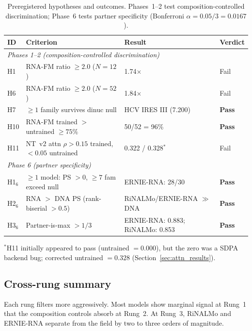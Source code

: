 \documentclass[11pt]{article}
\begin{document}
\begin{table}[ht]
\centering
\caption{Preregistered hypotheses and outcomes.
  Phases~1--2 test composition-controlled discrimination;
  Phase~6 tests partner specificity
  (Bonferroni $\alpha = 0.05/3 = 0.0167$).}
\label{tab:hypotheses}
\begin{tabular}{llll}
\toprule
ID & Criterion & Result & Verdict \\
\midrule
\multicolumn{4}{l}{\textit{Phases 1--2 (composition-controlled discrimination)}} \\
H1   & RNA-FM ratio $\geq 2.0$ ($N = 12$)                     & 1.74$\times$ & Fail \\
H6   & RNA-FM ratio $\geq 2.0$ ($N = 52$)                     & 1.84$\times$ & Fail \\
H7   & $\geq 1$ family survives dinuc null                     & HCV IRES III (7.200) & \textbf{Pass} \\
H10  & RNA-FM trained $>$ untrained $\geq 75\%$               & 50/52 = 96\% & \textbf{Pass} \\
H11  & NT~v2 attn $\rho > 0.15$ trained, $< 0.05$ untrained   & 0.322 / 0.328$^*$ & Fail \\
\midrule
\multicolumn{4}{l}{\textit{Phase 6 (partner specificity)}} \\
H1$_6$ & $\geq 1$ model: PS $> 0$, $\geq 7$ fam exceed null  & ERNIE-RNA: 28/30 & \textbf{Pass} \\
H2$_6$ & RNA $>$ DNA PS (rank-biserial $> 0.5$)               & RiNALMo/ERNIE-RNA $\gg$ DNA & \textbf{Pass} \\
H3$_6$ & Partner-is-max $> 1/3$                                & ERNIE-RNA: 0.883; RiNALMo: 0.853 & \textbf{Pass} \\
\bottomrule
\end{tabular}
\medskip

\small $^*$H11 initially appeared to pass (untrained $= 0.000$), but
the zero was a SDPA backend bug; corrected untrained $= 0.328$
(Section~\ref{sec:attn_results}).
\end{table}


\subsection{Cross-rung summary}
\label{sec:crossrung}

Each rung filters more aggressively.  Most models show marginal
signal at Rung~1 that the composition controls absorb at Rung~2.  At
Rung~3, RiNALMo and ERNIE-RNA separate from the field by two to
three orders of magnitude.
\end{document}
